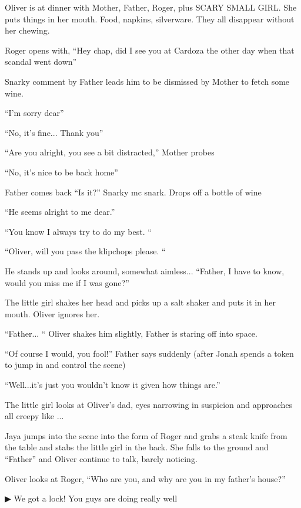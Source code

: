 
Oliver is at dinner with Mother, Father, Roger, plus SCARY SMALL GIRL.  She puts things in her mouth.  Food, napkins, silverware. They all disappear without her chewing.



Roger opens with, ``Hey chap, did I see you at Cardoza the other day when that scandal went down''

Snarky comment by Father leads him to be dismissed by Mother to fetch some wine. 

``I'm sorry dear''

``No, it's fine... Thank you''

``Are you alright, you see a bit distracted,'' Mother probes

``No, it's nice to be back home''

Father comes back ``Is it?'' Snarky mc snark.  Drops off a bottle of wine

``He seems alright to me dear.''

``You know I always try to do my best. ``

``Oliver, will you pass the klipchops please.  ``

He stands up and looks around, somewhat aimless... ``Father, I have to know, would you miss me if I was gone?''

The little girl shakes her head and picks up a salt shaker and puts it in her mouth. Oliver ignores her.

``Father... `` Oliver shakes him slightly, Father is staring off into space.  

``Of course I would, you fool!'' Father says suddenly (after Jonah spends a token to jump in and control the scene) 

``Well...it's just you wouldn't know it given how things are.''

The little girl looks at Oliver's dad, eyes narrowing in suspicion and approaches all creepy like ... 

Jaya jumps into the scene into the form of Roger and grabs a steak knife from the table and stabs the little girl in the back.  She falls to the ground and ``Father'' and Oliver continue to talk, barely noticing.

Oliver looks at Roger, ``Who are you, and why are you in my father's house?''



 {\color[RGB]{68,68,68}▶ } We got a lock!  You guys are doing really well



